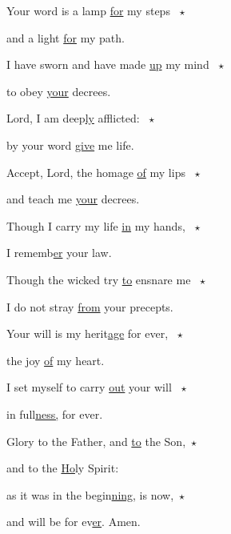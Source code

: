 \noindent Your word is a lamp \uline{for} my steps ~$\star$~\nopagebreak

and a light \uline{for} my path.

\noindent I have sworn and have made \uline{up} my mind ~$\star$~\nopagebreak

to obey \uline{your} decrees.

\noindent Lord, I am deep\uline{ly} afflicted: ~$\star$~\nopagebreak

by your word \uline{give} me life.

\noindent Accept, Lord, the homage \uline{of} my lips ~$\star$~\nopagebreak

and teach me \uline{your} decrees.

\noindent Though I carry my life \uline{in} my hands, ~$\star$~\nopagebreak

I rememb\uline{er} your law.

\noindent Though the wicked try \uline{to} ensnare me ~$\star$~\nopagebreak

I do not stray \uline{from} your precepts.

\noindent Your will is my herit\uline{age} for ever, ~$\star$~\nopagebreak

the joy \uline{of} my heart.

\noindent I set myself to carry \uline{out} your will ~$\star$~\nopagebreak

in full\uline{ness,} for ever.



\noindent Glory to the Father, and \uline{to} the Son,~$\star$~\nopagebreak

and to the \uline{Ho}ly Spirit:

\noindent as it was in the begin\uline{ning}, is now,~$\star$~\nopagebreak

and will be for ev\uline{er}. Amen.

